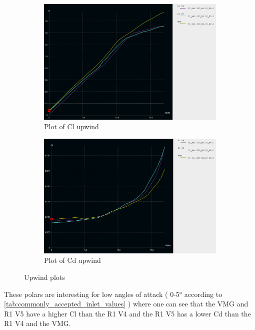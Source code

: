 \begin{figure}[H]
\begin{subfigure}{0.5\textwidth}
\includegraphics[width=1.\textwidth]{figures/2D steady simulations/xflr5/Cl upwind.png}
\caption{Plot of Cl upwind}
\label{fig:Plot_of_Cl_upwind}
\end{subfigure}
\begin{subfigure}{0.5\textwidth}
\includegraphics[width=01.\textwidth]{figures/2D steady simulations/xflr5/Cd upwind.png}
\caption{Plot of Cd upwind}
\label{fig:Plot_of_Cd_upwind}
\end{subfigure}
\caption{Upwind plots}
\label{fig:Upwind_plots}
\end{figure}

These polars are interesting for low angles of attack ( 0-5° according to \ref{tab:commonly_accepted_inlet_values} ) where one can see that the VMG and R1 V5 have a higher Cl than the R1 V4 and the R1 V5 has a lower Cd than the R1 V4 and the VMG. 

